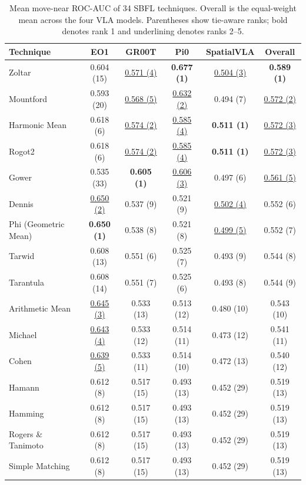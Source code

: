 \begin{table}[t]
\centering
\caption{Mean move-near ROC-AUC of 34 SBFL techniques. Overall is the equal-weight mean across the four VLA models. Parentheses show tie-aware ranks; bold denotes rank 1 and underlining denotes ranks 2--5.}
\label{tab:rq5-transfer-roc-auc}
{\scriptsize
\setlength{\tabcolsep}{4pt}
\renewcommand{\arraystretch}{0.96}
\begin{tabular}{lccccc}
\toprule
Technique & EO1 & GR00T & Pi0 & SpatialVLA & Overall \\
\midrule
Zoltar & 0.604 (15) & \underline{0.571 (4)} & \textbf{0.677 (1)} & \underline{0.504 (3)} & \textbf{0.589 (1)} \\
Mountford & 0.593 (20) & \underline{0.568 (5)} & \underline{0.632 (2)} & 0.494 (7) & \underline{0.572 (2)} \\
Harmonic Mean & 0.618 (6) & \underline{0.574 (2)} & \underline{0.585 (4)} & \textbf{0.511 (1)} & \underline{0.572 (3)} \\
Rogot2 & 0.618 (6) & \underline{0.574 (2)} & \underline{0.585 (4)} & \textbf{0.511 (1)} & \underline{0.572 (3)} \\
Gower & 0.535 (33) & \textbf{0.605 (1)} & \underline{0.606 (3)} & 0.497 (6) & \underline{0.561 (5)} \\
Dennis & \underline{0.650 (2)} & 0.537 (9) & 0.521 (9) & \underline{0.502 (4)} & 0.552 (6) \\
Phi (Geometric Mean) & \textbf{0.650 (1)} & 0.538 (8) & 0.521 (8) & \underline{0.499 (5)} & 0.552 (7) \\
Tarwid & 0.608 (13) & 0.551 (6) & 0.525 (7) & 0.493 (9) & 0.544 (8) \\
Tarantula & 0.608 (14) & 0.551 (7) & 0.525 (6) & 0.493 (8) & 0.544 (9) \\
Arithmetic Mean & \underline{0.645 (3)} & 0.533 (13) & 0.513 (12) & 0.480 (10) & 0.543 (10) \\
Michael & \underline{0.643 (4)} & 0.533 (12) & 0.514 (11) & 0.473 (12) & 0.541 (11) \\
Cohen & \underline{0.639 (5)} & 0.533 (11) & 0.514 (10) & 0.472 (13) & 0.540 (12) \\
Hamann & 0.612 (8) & 0.517 (15) & 0.493 (13) & 0.452 (29) & 0.519 (13) \\
Hamming & 0.612 (8) & 0.517 (15) & 0.493 (13) & 0.452 (29) & 0.519 (13) \\
Rogers \& Tanimoto & 0.612 (8) & 0.517 (15) & 0.493 (13) & 0.452 (29) & 0.519 (13) \\
Simple Matching & 0.612 (8) & 0.517 (15) & 0.493 (13) & 0.452 (29) & 0.519 (13) \\

\end{tabular}}
\end{table}
